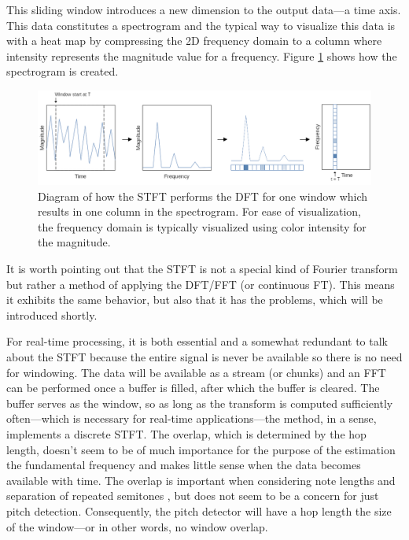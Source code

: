 This sliding window introduces a new dimension to the output data—a time axis. This data constitutes a spectrogram and the typical way to visualize this data is with a heat map by compressing the 2D frequency domain to a column where intensity represents the magnitude value for a frequency. Figure \ref{fig:stft} shows how the spectrogram is created.

\begin{figure}[ht]
    \centering
    \includegraphics[width=\textwidth]{./images/stft.png}
    \caption{Diagram of how the STFT performs the DFT for one window which results in one column in the spectrogram. For ease of visualization, the frequency domain is typically visualized using color intensity for the magnitude. \label{fig:stft}}
\end{figure}

It is worth pointing out that the STFT is not a special kind of Fourier transform but rather a method of applying the DFT/FFT (or continuous FT). This means it exhibits the same behavior, but also that it has the problems, which will be introduced shortly. 

For real-time processing, it is both essential and a somewhat redundant to talk about the STFT because the entire signal is never be available so there is no need for windowing. The data will be available as a stream (or chunks) and an FFT can be performed once a buffer is filled, after which the buffer is cleared. The buffer serves as the window, so as long as the transform is computed sufficiently often—which is necessary for real-time applications—the method, in a sense, implements a discrete STFT. The overlap, which is determined by the hop length, doesn't seem to be of much importance for the purpose of the estimation the fundamental frequency and makes little sense when the data becomes available with time. The overlap is important when considering note lengths and separation of repeated semitones \cite{Evans2012}, but does not seem to be a concern for just pitch detection. Consequently, the pitch detector will have a hop length the size of the window—or in other words, no window overlap.

